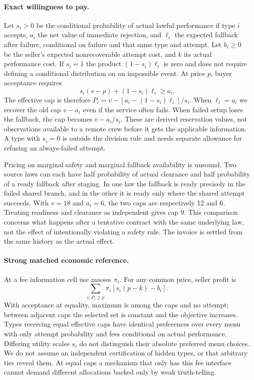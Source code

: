 \documentclass{article}
\begin{document}
\paragraph{Exact willingness to pay.}
Let $s_i>0$ be the conditional probability of actual lawful performance if type $i$ accepts, $a_i$ the net value of immediate rejection, and $\ell_i$ the expected fallback after failure, conditional on failure and that same type and attempt. Let $b_i\ge0$ be the seller's expected nonrecoverable attempt cost, and $k$ its actual performance cost. If $s_i=1$ the product $(1-s_i)\ell_i$ is zero and does not require defining a conditional distribution on an impossible event. At price $p$, buyer acceptance requires
\[
s_i(v-p)+(1-s_i)\ell_i\ge a_i.
\]
The effective cap is therefore $P_i=v-[a_i-(1-s_i)\ell_i]/s_i$. When $\ell_i=a_i$ we recover the old cap $v-a_i$ even if the service often fails. When failed setup loses the fallback, the cap becomes $v-a_i/s_i$. These are derived reservation values, not observations available to a remote crew before it gets the applicable information. A type with $s_i=0$ is outside the division rule and needs separate allowance for refusing an always-failed attempt.

Pricing on marginal safety and marginal fallback availability is unsound. Two source laws can each have half probability of actual clearance and half probability of a ready fallback after staging. In one law the fallback is ready precisely in the failed shared branch, and in the other it is ready only where the shared attempt succeeds. With $v=18$ and $a_i=6$, the two caps are respectively 12 and 6. Treating readiness and clearance as independent gives cap 9. This comparison concerns what happens after a tentative contract with the same underlying law, not the effect of intentionally violating a safety rule. The invoice is settled from the same history as the actual effect.

\paragraph{Strong matched economic reference.}
At a fee information cell use masses $\pi_i$. For any common price, seller profit is
\[
 \sum_{i:P_i\ge p}\pi_i[s_i(p-k)-b_i].
\]
With acceptance at equality, maximum is among the caps and no attempt; between adjacent caps the selected set is constant and the objective increases. Types receiving equal effective caps have identical preferences over every menu with only attempt probability and fees conditional on actual performance. Differing utility scales $s_i$ do not distinguish their absolute preferred menu choices. We do not assume an independent certification of hidden types, or that arbitrary ties reveal them. At equal caps a mechanism that only has this fee interface cannot demand different allocations backed only by weak truth-telling.
\end{document}
